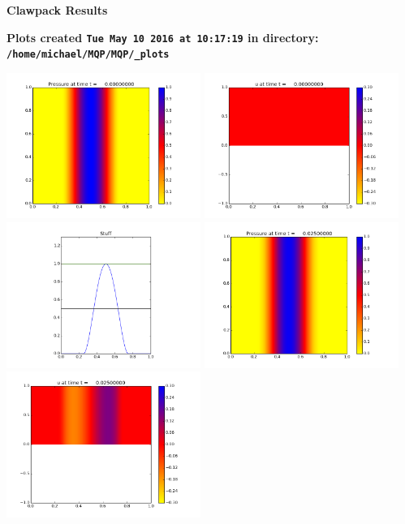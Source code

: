 \documentclass[11pt]{article}
\begin{document}
        \begin{center}{\Large\bf Clawpack Results}\vskip 5pt
        
        \bf Plots created {\tt Tue May 10 2016 at 10:17:19} in directory: \vskip 5pt
        \verb+/home/michael/MQP/MQP/_plots+
        \end{center}
        \vskip 5pt
        \includegraphics[width=0.475\textwidth]{frame0000fig0.png}
\includegraphics[width=0.475\textwidth]{frame0000fig1.png}
\vskip 10pt 
\includegraphics[width=0.475\textwidth]{frame0000fig3.png}
\vskip 10pt 
\includegraphics[width=0.475\textwidth]{frame0001fig0.png}
\includegraphics[width=0.475\textwidth]{frame0001fig1.png}
\end{document}
